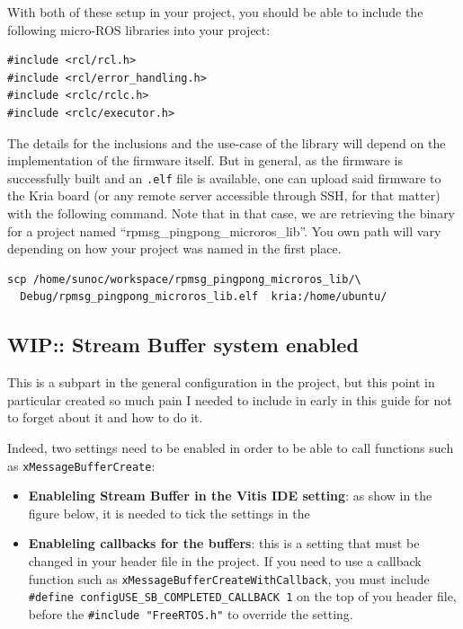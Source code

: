 \documentclass[10pt]{article}
\begin{document}
With both of these setup in your project, you should be able to include the following micro-ROS libraries into your project:
\begin{tcolorbox}
\begin{verbatim}
#include <rcl/rcl.h>
#include <rcl/error_handling.h>
#include <rclc/rclc.h>
#include <rclc/executor.h>
\end{verbatim}
\end{tcolorbox}

The details for the inclusions and the use-case of the library will depend on the implementation of the firmware
itself.
But in general, as the firmware is successfully built and an \verb|.elf| file is available, one can upload said
firmware to the Kria board (or any remote server accessible through SSH, for that matter) with the following
command.
Note that in that case, we are retrieving the binary for a project named ``rpmsg\_pingpong\_microros\_lib''.
You own path will vary depending on how your project was named in the first place.
\begin{tcolorbox}
\begin{verbatim}
scp /home/sunoc/workspace/rpmsg_pingpong_microros_lib/\
  Debug/rpmsg_pingpong_microros_lib.elf  kria:/home/ubuntu/
\end{verbatim}
\end{tcolorbox}

\subsection{WIP:: Stream Buffer system enabled}
This is a subpart in the general configuration in the project, but this
point in particular created so much pain I needed to include in early in this
guide for not to forget about it and how to do it.

Indeed, two settings need to be enabled in order to be able to call
functions such as \verb|xMessageBufferCreate|:

\begin{itemize}
\item \textbf{Enableling Stream Buffer in the Vitis IDE setting}: as show in the
  figure below, it is needed to tick the settings in the 
\item \textbf{Enableling callbacks for the buffers}: this is a setting that must
  be changed in your header file in the project. If you need to use a callback
  function such as \verb|xMessageBufferCreateWithCallback|, you must include
  \verb|#define configUSE_SB_COMPLETED_CALLBACK 1| on the top of you header
  file, before the \verb|#include "FreeRTOS.h"| to override the setting.
\end{itemize}
\end{document}
